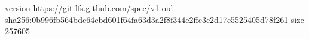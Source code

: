 version https://git-lfs.github.com/spec/v1
oid sha256:0b996fb564bdc64cbd601f64fa63d3a2f8f344e2ffc3c2d17e5525405d78f261
size 257605
